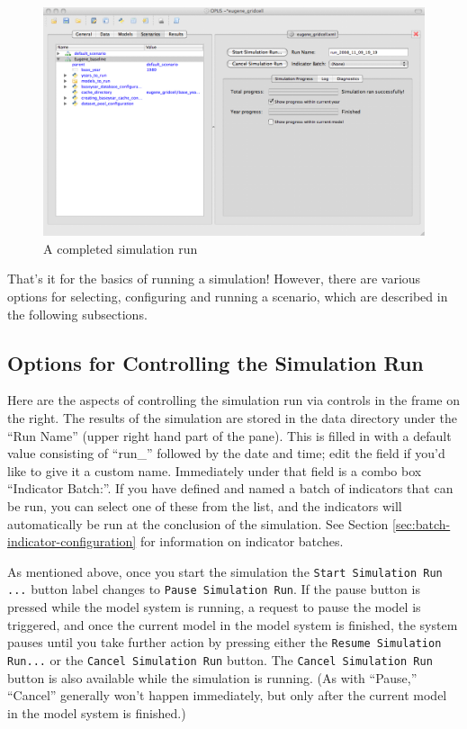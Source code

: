 \begin{figure}[htp]
\begin{center}
\includegraphics[scale=0.4]{part-gui/images/scenario-manager-completed-run.png}
\end{center}
\caption{A completed simulation run}
\label{fig:scenario-manager-completed-run}
\end{figure}

That's it for the basics of running a simulation!  However, there are
various options for selecting, configuring and running a scenario, which
are described in the following subsections.

\subsection{Options for Controlling the Simulation Run}
\label{sec:controlling-simulation}

Here are the aspects of controlling the simulation run via controls in the
frame on the right.  The results of the simulation are stored in the data
directory under the ``Run Name'' (upper right hand part of the pane).  This
is filled in with a default value consisting of ``run\_'' followed by the
date and time; edit the field if you'd like to give it a custom name.
Immediately under that field is a combo box ``Indicator Batch:''.  If you
have defined and named a batch of indicators that can be run, you can
select one of these from the list, and the indicators will automatically be
run at the conclusion of the simulation.  See Section
\ref{sec:batch-indicator-configuration} for information on indicator
batches.

As mentioned above, once you start the simulation the
\verb#Start Simulation Run ...# button label changes to
\verb#Pause Simulation Run#\@.  If the pause button is pressed while the
model system is running, a request to pause the model is triggered, and
once the current model in the model system is finished, the system pauses
until you take further action by pressing either the
\verb#Resume Simulation Run...# or the \verb#Cancel Simulation Run# button.
The \verb#Cancel Simulation Run# button is also available while the
simulation is running.  (As with ``Pause,'' ``Cancel'' generally won't
happen immediately, but only after the current model in the model system is
finished.)

